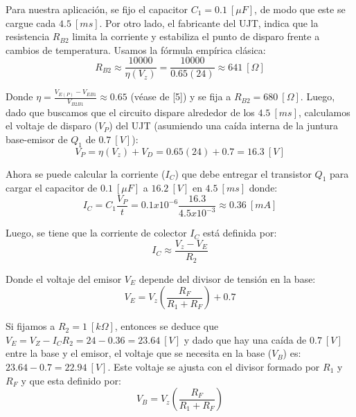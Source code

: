 \documentclass[12pt,a4paper]{article}
\begin{document}
\begin{itemize}
    Para nuestra aplicación, se fijo el capacitor $C_{1} = 0.1 \ [\mu F]$, de modo que este se cargue cada $4.5 \ [ms]$. Por otro lado, el fabricante del UJT, indica que la resistencia $R_{B2}$ limita la corriente y estabiliza el punto de disparo frente a cambios de temperatura. Usamos la fórmula empírica clásica:
    \begin{equation}
        R_{B2} \approx \frac{10000}{\eta (V_{z})} = \frac{10000}{0.65(24)} \approx 641 \ [\Omega]
        \label{eq_3}
    \end{equation}
    
    Donde $\eta = \frac{V_{E(P)} - V_{EB1}}{V_{B2B1}} \approx 0.65$ (véase de [5]) y se fija a $R_{B2} = 680 \ [\Omega]$. Luego, dado que buscamos que el circuito dispare alrededor de los $4.5 \ [ms]$, calculamos el voltaje de disparo ($V_P$) del UJT (asumiendo una caída interna de la juntura base-emisor de $Q_{1}$ de $0.7 \ [V]$):
    \begin{equation}
        V_{P} = \eta(V_{z}) + V_{D} = 0.65(24) + 0.7 = 16.3 \ [V]
        \label{eq_4}
    \end{equation}
    
    Ahora se puede calcular la corriente ($I_{C}$) que debe entregar el transistor $Q_{1}$ para cargar el capacitor de $0.1 \ [\mu F]$ a $16.2 \ [V]$ en $4.5 \ [ms]$ donde:
    \begin{equation}
        I_{C} = C_{1} \frac{V_{P}}{t} = 0.1x10^{-6} \frac{16.3}{4.5x10^{-3}} \approx 0.36 \ [mA]
        \label{eq_5}
    \end{equation}
    
    Luego, se tiene que la corriente de colector $I_{C}$ está definida por:
    \begin{equation}
        I_{C} \approx \frac{V_{z} - V_{E}}{R_{2}}
        \label{eq_6}
    \end{equation}
    
    Donde el voltaje del emisor $V_{E}$ depende del divisor de tensión en la base:
    \begin{equation}
        V_{E} = V_{z}\left(\frac{R_{F}}{R_{1} + R_{F}}\right) + 0.7
        \label{eq_7}
    \end{equation}
    
    Si fijamos a $R_{2} = 1 \ [k\Omega]$, entonces se deduce que $V_{E} = V_{Z} - I_{C}R_{2} = 24 - 0.36 = 23.64 \ [V]$ y dado que hay una caída de $0.7 \ [V]$ entre la base y el emisor, el voltaje que se necesita en la base ($V_{B}$) es: $23.64 - 0.7 = 22.94 \ [V]$. Este voltaje se ajusta con el divisor formado por $R_1$ y $R_F$ y que esta definido por:
    \begin{equation}
        V_{B} = V_{z} \left(\frac{R_{F}}{R_{1} + R_{F}}\right)
        \label{eq_8}
    \end{equation}
    

\end{itemize}
\end{document}
